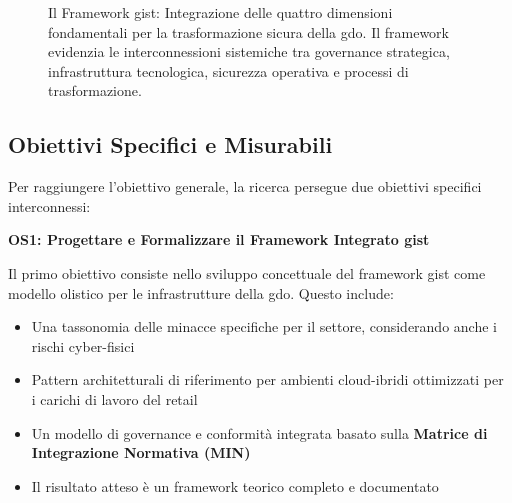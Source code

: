 \begin{figure}[H]
\caption{Il Framework \gls{gist}: Integrazione delle quattro dimensioni fondamentali per la trasformazione sicura della \gls{gdo}. Il framework evidenzia le interconnessioni sistemiche tra governance strategica, infrastruttura tecnologica, sicurezza operativa e processi di trasformazione.}
\label{fig:gist_framework}
\end{figure}

\subsection{\texorpdfstring{Obiettivi Specifici e Misurabili}{1.3.2 - Obiettivi Specifici e Misurabili}}
\label{subsec:obiettivi_specifici}

Per raggiungere l'obiettivo generale, la ricerca persegue due obiettivi specifici interconnessi:

\textbf{OS1: Progettare e Formalizzare il Framework Integrato \gls{gist}}

Il primo obiettivo consiste nello sviluppo concettuale del framework \gls{gist} come modello olistico per le infrastrutture della \gls{gdo}. Questo include:
\begin{itemize}
\item Una tassonomia delle minacce specifiche per il settore, considerando anche i rischi cyber-fisici
\item Pattern architetturali di riferimento per ambienti cloud-ibridi ottimizzati per i carichi di lavoro del retail
\item Un modello di governance e conformità integrata basato sulla \textbf{Matrice di Integrazione Normativa (MIN)}
\item Il risultato atteso è un framework teorico completo e documentato
\end{itemize}

